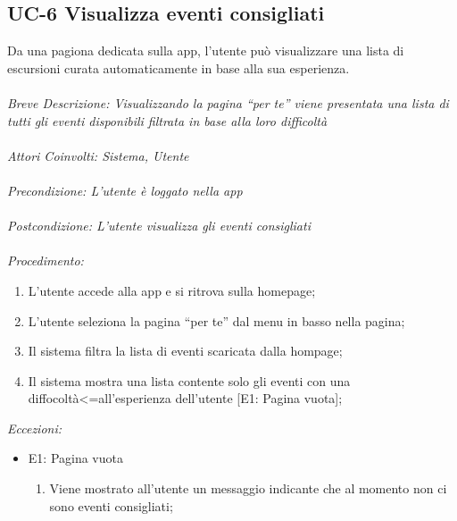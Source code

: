 \subsection{UC-6 Visualizza eventi consigliati}
Da una pagiona dedicata sulla app, l'utente può visualizzare una lista di escursioni curata automaticamente in base alla sua esperienza.
\\
\\
\textit{Breve Descrizione: Visualizzando la pagina ``per te'' viene presentata una lista di tutti gli eventi disponibili filtrata in base alla loro difficoltà} 
\\
\\
\textit{Attori Coinvolti: Sistema, Utente}
\\
\\
\textit{Precondizione: L'utente è loggato nella app}
\\
\\
\textit{Postcondizione: L'utente visualizza gli eventi consigliati}
\\
\\
\textit{Procedimento:}
\begin{enumerate}
	\item L'utente accede alla app e si ritrova sulla homepage;
	\item L'utente seleziona la pagina ``per te'' dal menu in basso nella pagina;
	\item Il sistema filtra la lista di eventi scaricata dalla hompage;
	\item Il sistema mostra una lista contente solo gli eventi con una diffocoltà<=all'esperienza dell'utente [E1: Pagina vuota];
\end{enumerate}


\textit{Eccezioni:}
\begin{itemize}
	\item E1: Pagina vuota
	\begin{enumerate}
		\item Viene mostrato all'utente un messaggio indicante che al momento non ci sono eventi consigliati;
	\end{enumerate}
\end{itemize}